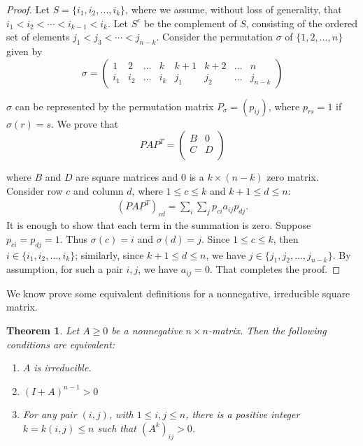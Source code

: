 \documentclass[a4paper,11pt]{report}
\newtheorem{theorem}{Theorem}[section]
\begin{document}
\begin{proof}
  Let $S=\{i_1, i_2,\ldots, i_k\}$, where we assume, without loss of generality, 
  that $i_1 < i_2 < \cdots < i_{k-1} < i_k$. Let $S^c$ be the complement of $S$, consisting of the
  ordered set of elements $j_1 < j_3 < \cdots < j_{n-k}$. Consider the permutation $\sigma$ of
  $\{1,2,\ldots,n\}$ given by
  $$\sigma = \begin{pmatrix} 1 & 2 & \ldots & k & k + 1 & k+ 2 & \ldots & n \\ 
  i_1 & i_2 & \ldots & i_k & j_1 & j_2 & \ldots & j_{n-k} \end{pmatrix} $$

$\sigma$ can be represented by the permutation matrix $P_\sigma = (p_{ij})$, 
where $p_{rs} = 1$ if $\sigma(r) = s$. We prove that
 $$PAP^T = \begin{pmatrix}  B  & 0\\
 C  & D\\
\end{pmatrix} $$

where $B$ and $D$ are square matrices and $0$ is a $k \times (n-k)$ zero matrix. 
Consider row $c$ and column $d$, where $1 \leq c \leq k$ and $k + 1 \leq d \leq
n$:
\begin{eqnarray}\label{redenering1}
(PAP^T)_{cd} = \sum_i\sum_j p_{c i}a_{ij}p_{d j}.
\end{eqnarray}
It is enough to show that each term in the summation is zero. Suppose $p_{c i} =
p_{d j} = 1$. Thus $\sigma(c) = i$ and $\sigma(d)= j.$ Since $1 \leq c \leq
k$, then $i \in \{i_1, i_2,\ldots, i_k\}$; similarly, since $k+1 \leq d \leq n$, we have $j \in 
\{j_1,j_2,\ldots,j_{n-k}\}.$ By assumption, for such a pair $i, j$, we have $a_{ij}=0$. That completes
the proof. 
\end{proof}
We know prove some equivalent definitions for a nonnegative, irreducible square 
matrix.
\begin{theorem}\label{irredubieleegenschappen}
  Let $A\geq 0$ be a nonnegative $n\times n$-matrix. Then the following conditions are 
  equivalent:
  \begin{enumerate}
    \item[(1)] $A$ is irreducible.
    \item[(2)] $(I + A)^{n-1} > 0$
   \item[(3)] For any pair $(i,j)$, with $1 \leq i, j \leq n$, there is a 
   positive integer $k = k(i,j) \leq n$ such that $(A^k)_{ij} > 0$.
  \end{enumerate}
\end{theorem}
\end{document}
